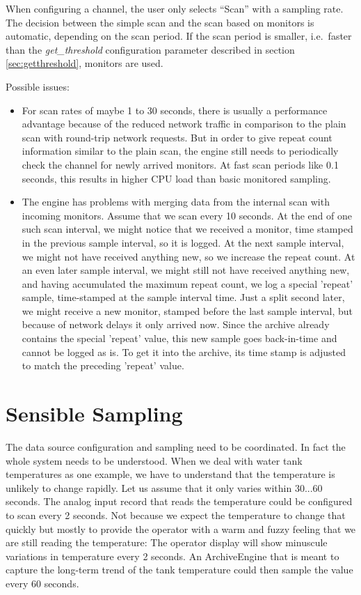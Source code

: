 When configuring a channel, the user only selects ``Scan'' with a sampling rate.
The decision between the simple scan and the scan based on monitors is
automatic, depending on the scan period. If the scan period is smaller,
i.e.\ faster than the \emph{get\_threshold} configuration
parameter described in section \ref{sec:getthreshold}, 
monitors are used.

Possible issues:
\begin{itemize}
\item
For scan rates of maybe 1 to 30 seconds, there is usually a performance
advantage because of the reduced network traffic in comparison to
the plain scan with round-trip network requests.
But in order to give repeat count information similar to the plain scan,
the engine still needs to periodically check the channel for newly arrived
monitors. At fast scan periods like 0.1 seconds, this results in higher
CPU load than basic monitored sampling.
\item
The engine has problems with merging data from the internal scan with
incoming monitors.
Assume that we scan every 10 seconds.
At the end of one such scan interval, we might notice that we received a monitor,
time stamped in the previous sample interval, so it is logged.
At the next sample interval, we might not have received anything new,
so we increase the repeat count.
At an even later sample interval, we might still not have received anything
new, and having accumulated the maximum repeat count, we log a special 'repeat'
sample, time-stamped at the sample interval time.
Just a split second later, we might receive a new monitor, stamped before the
last sample interval, but because of network delays it only arrived now.
Since the archive already contains the special 'repeat' value, this new sample
goes back-in-time and cannot be logged as is.
To get it into the archive, its time stamp is adjusted to match the
preceding 'repeat' value. 
\end{itemize}

\section{Sensible Sampling}


The data source configuration and sampling need to be coordinated.  In
fact the whole system needs to be understood. When we deal with water
tank temperatures as one example, we have to understand that the
temperature is unlikely to change rapidly. Let us assume that it only
varies within 30...60 seconds. The analog input record that reads the
temperature could be configured to scan every 2 seconds. Not because
we expect the temperature to change that quickly but mostly to provide
the operator with a warm and fuzzy feeling that we are still reading
the temperature: The operator display will show minuscule variations
in temperature every 2 seconds.  An ArchiveEngine that is meant to
capture the long-term trend of the tank temperature could then sample
the value every 60 seconds.

